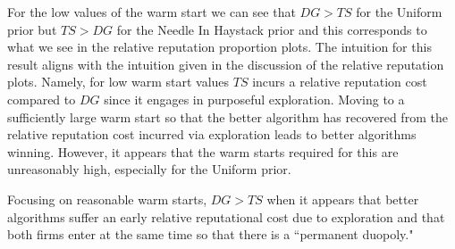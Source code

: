 \documentclass{article}
\theoremstyle{definition}
\begin{document}
For the low values of the warm start we can see that $DG > TS$ for the Uniform prior but $TS > DG$ for the Needle In Haystack prior and this corresponds to what we see in the relative reputation proportion plots. The intuition for this result aligns with the intuition given in the discussion of the relative reputation plots. Namely, for low warm start values $TS$ incurs a relative reputation cost compared to $DG$ since it engages in purposeful exploration. Moving to a sufficiently large warm start so that the better algorithm has recovered from the relative reputation cost incurred via exploration leads to better algorithms winning. However, it appears that the warm starts required for this are unreasonably high, especially for the Uniform prior.

Focusing on reasonable warm starts, $DG > TS$ when it appears that better algorithms suffer an early relative reputational cost due to exploration and that both firms enter at the same time so that there is a ``permanent duopoly."
\end{document}
